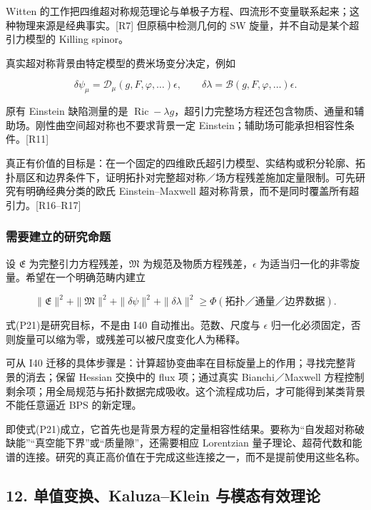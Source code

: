 \documentclass[UTF8,a4paper,11pt,fontset=fandol]{ctexart}
\begin{document}
Witten
的工作把四维超对称规范理论与单极子方程、四流形不变量联系起来；这种物理来源是经典事实。{[}R7{]}
但原稿中检测几何的 SW 旋量，并不自动是某个超引力模型的 Killing spinor。

真实超对称背景由特定模型的费米场变分决定，例如

\[
\delta\psi_\mu=\mathcal D_\mu(g,F,\varphi,\ldots)\epsilon,
\qquad
\delta\lambda=\mathcal B(g,F,\varphi,\ldots)\epsilon.
\tag{P20}
\]

原有 Einstein 缺陷测量的是
\(\operatorname{Ric}-\lambda g\)，超引力完整场方程还包含物质、通量和辅助场。刚性曲空间超对称也不要求背景一定
Einstein；辅助场可能承担相容性条件。{[}R11{]}

真正有价值的目标是：在一个固定的四维欧氏超引力模型、实结构或积分轮廓、拓扑扇区和边界条件下，证明拓扑对完整超对称／场方程残差施加定量限制。可先研究有明确经典分类的欧氏
Einstein--Maxwell 超对称背景，而不是同时覆盖所有超引力。{[}R16--R17{]}

\subsubsection{需要建立的研究命题}\label{ux9700ux8981ux5efaux7acbux7684ux7814ux7a76ux547dux9898}

设 \(\mathfrak E\) 为完整引力方程残差，\(\mathfrak M\)
为规范及物质方程残差，\(\epsilon\)
为适当归一化的非零旋量。希望在一个明确范畴内建立

\[
\|\mathfrak E\|^2+\|\mathfrak M\|^2
+\|\delta\psi\|^2+\|\delta\lambda\|^2
\ge\Phi(\text{拓扑／通量／边界数据}).
\tag{P21}
\]

式(P21)是研究目标，不是由 I40 自动推出。范数、尺度与 \(\epsilon\)
归一化必须固定，否则旋量可以缩为零，或残差可以被尺度变化人为稀释。

可从 I40
迁移的具体步骤是：计算超协变曲率在目标旋量上的作用；寻找完整背景的消去；保留
Hessian 交换中的 flux 项；通过真实 Bianchi／Maxwell
方程控制剩余项；用全局规范与拓扑数据完成吸收。这个流程成功后，才可能得到某类背景不能任意逼近
BPS 的新定理。

即使式(P21)成立，它首先也是背景方程的定量相容性结果。要称为``自发超对称破缺能''``真空能下界''或``质量隙''，还需要相应
Lorentzian
量子理论、超荷代数和能谱的连接。研究的真正高价值在于完成这些连接之一，而不是提前使用这些名称。

\subsection{12. 单值变换、Kaluza--Klein
与模态有效理论}\label{ux5355ux503cux53d8ux6362kaluzaklein-ux4e0eux6a21ux6001ux6709ux6548ux7406ux8bba}
\end{document}
